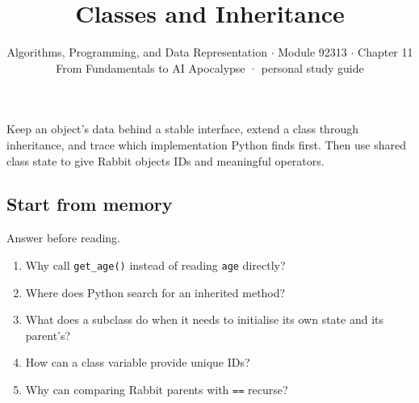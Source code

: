 \documentclass[11pt]{article}
\title{\sffamily\bfseries\color{FAUblue}Classes and Inheritance}
\author{Algorithms, Programming, and Data Representation \ensuremath{\cdot} Module 92313 \ensuremath{\cdot} Chapter 11\\[2pt]\small From Fundamentals to AI Apocalypse · personal study guide}
\date{}
\begin{document}
\maketitle
\begingroup\footnotesize\setlength{\parskip}{0pt}\tableofcontents\endgroup
\clearpage

{\large Keep an object’s data behind a stable interface, extend a class through inheritance, and trace which implementation Python finds first. Then use shared class state to give Rabbit objects IDs and meaningful operators.}


\begin{keepsection}
\section{Start from memory}

Answer before reading.

\begin{enumerate}
\item Why call \texttt{get\_age()} instead of reading \texttt{age} directly?
\item Where does Python search for an inherited method?
\item What does a subclass do when it needs to initialise its own state and its parent’s?
\item How can a class variable provide unique IDs?
\item Why can comparing Rabbit parents with \texttt{==} recurse?
\end{enumerate}

\end{keepsection}
\end{document}
